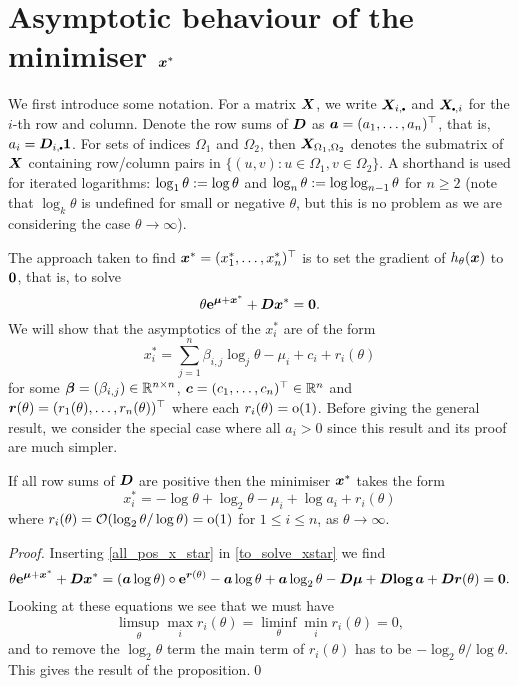 \section{Asymptotic behaviour of the minimiser $\bm{x}^*$} \label{sec:x_star_asymp_}

We first introduce some notation. For a matrix $\bm{X}$, we write
$\bfX_{i,\sbullet}$ and $\bfX_{\sbullet,i}$ for the $i$-th row and
column. Denote the row sums of $\bm{D}$ as $\bm{a} = (a_1,\dots,a_n)^\top$, that
is, $a_i=\bfD_{i,\sbullet} \bfone$. For sets of indices $\Omega_1$ and
$\Omega_2$, then $\bm{X}_{\Omega_1,\Omega_2}$ denotes the submatrix of $\bm{X}$
containing row/column pairs in $\{ (u,v) : u \in \Omega_1, v \in \Omega_2\}$.
A shorthand is used for iterated logarithms: $\log_1 \theta := \log
\theta$ and $\log_n \theta := \log \log_{n-1} \theta$ for $n \ge 2$ (note
that $\log_k \theta$ is undefined for small or negative $\theta$, but this
is no problem as we are considering the case $\theta \to \infty$).

The approach taken to find $\bm{x}^*=(x_1^*,\dots,x_n^*)^\top$ is to set the
gradient of $h_\theta(\bm{x})$ to $\bm{0}$, that is, to solve
\begin{equation} \label{to_solve_xstar}
	\theta \text{\bf{e}}^{\bm{\mu} + \bm{x}^*} + \bm{D} \bm{x}^* = \bm{0} .
\end{equation}
We will show that the asymptotics of the $x_i^*$ are of the form
\begin{equation} \label{general_form}
	x_i^* = \sum_{j=1}^{n} \beta_{i,j} \log_j \theta - \mu_i + c_i + r_i(\theta)
\end{equation}
for some $\bm{\beta} = (\beta_{i,j}) \in \mathbb{R}^{n \times n}$, $\bm{c} = (c_1, \dots,
c_n)^\top \in \mathbb{R}^n$ and $\bm{r}(\theta) = (r_1(\theta), \dots, r_n(\theta))^\top$
where each $r_i(\theta) = {\mathrm{o}}(1)$.  Before giving the general result, we
consider the special case where all $a_i>0$ since this result and its proof
are much simpler.

\begin{proposition} \label{all_pos_prop}
If all row sums of $\bm{D}$ are positive then the minimiser $\bm{x}^*$ takes the form
\begin{equation} \label{all_pos_x_star}
    x_i^* = {-}\log \theta + \log_2 \theta - \mu_i + \log a_i + r_i(\theta)
\end{equation}
where $r_i(\theta) = {\mathcal{O}}(\log_2 \theta / \log \theta) = {\mathrm{o}}(1)$ for $1 \leq i
\leq n$, as $\theta \to \infty$.
\end{proposition}

\begin{proof}
Inserting \eqref{all_pos_x_star} in \eqref{to_solve_xstar} we find
\[
    \theta \text{\bf{e}}^{\bm{\mu} + \bm{x}^*} + \bm{D} \bm{x}^*
    = (\bm{a} \log \theta) \circ \text{\bf{e}}^{\bm{r}(\theta)} - \bm{a} \log \theta
+ \bm{a} \log_2 \theta - \bm{D}  \bm{\mu} + \bm{D}  \text{\bf{log}}\, \bm{a} + \bm{D} \bm{r}(\theta) = \bm{0} .
\]
Looking at these equations we see that we must have
\[
 \limsup_\theta \max_i r_i(\theta) = \liminf_\theta \min_i r_i(\theta) = 0,
\]
and to remove the $\log_2 \theta$ term the main term of $r_i(\theta)$ has to
be $-\log_2 \theta /\log \theta$. This gives the result of the
proposition.\qed
\end{proof}

